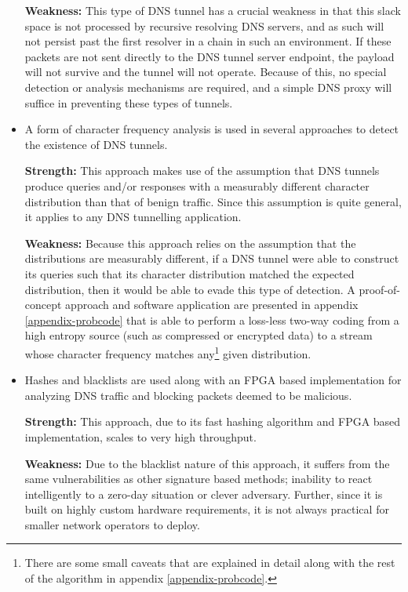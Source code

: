 \documentclass[12pt]{report}
\theoremstyle{remark}
\theoremstyle{definition}
\theoremstyle{definition}
\theoremstyle{definition}
\begin{document}
\begin{itemize}
\textbf{Weakness:} This type of DNS tunnel has a crucial weakness in that this
slack space is not processed by recursive resolving DNS servers, and as such will
not persist past the first resolver in a chain in such an environment. If these
packets are not sent directly to the DNS tunnel server endpoint, the payload
will not survive and the tunnel will not operate. Because of this, no special
detection or analysis mechanisms are required, and a simple DNS proxy will
suffice in preventing these types of tunnels.

\item A form of character frequency analysis is used in several approaches to
detect the existence of DNS tunnels.

\textbf{Strength:} This approach makes use of the assumption that DNS tunnels
produce queries and/or responses with a measurably different character
distribution than that of benign traffic. Since this assumption is quite
general, it applies to any DNS tunnelling application.

\textbf{Weakness:} Because this approach relies on the assumption that the
distributions are measurably different, if a DNS tunnel were able to construct
its queries such that its character distribution matched the expected
distribution, then it would be able to evade this type of detection. A
proof-of-concept approach and software application are presented in appendix
\ref{appendix-probcode} that is able to perform a loss-less two-way coding from a high
entropy source (such as compressed or encrypted data) to a stream whose
character frequency matches any\footnote{There are some small caveats that are
explained in detail along with the rest of the algorithm in appendix \ref{appendix-probcode}.} given distribution.

\item Hashes and blacklists are used along with an FPGA based implementation for 
analyzing DNS traffic and blocking packets deemed to be malicious.

\textbf{Strength:} This approach, due to its fast hashing algorithm and FPGA
based implementation, scales to very high throughput.

\textbf{Weakness:} Due to the blacklist nature of this approach, it suffers from
the same vulnerabilities as other signature based methods; inability to react
intelligently to a zero-day situation or clever adversary. Further, since it is
built on highly custom hardware requirements, it is not always practical for
smaller network operators to deploy.


\end{itemize}
\end{document}
